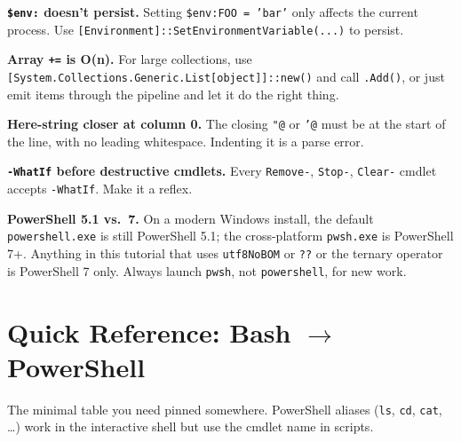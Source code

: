 \documentclass[11pt,a4paper]{article}
\begin{document}
\textbf{\texttt{\$env:} doesn't persist.} Setting
\texttt{\$env:FOO = 'bar'} only affects the current process. Use
\texttt{[Environment]::SetEnvironmentVariable(...)} to persist.

\textbf{Array \texttt{+=} is O(n).} For large collections, use
\texttt{[System.Collections.Generic.List[object]]::new()} and call
\texttt{.Add()}, or just emit items through the pipeline and let it
do the right thing.

\textbf{Here-string closer at column 0.} The closing
\texttt{"@} or \texttt{'@} must be at the start of the line, with
no leading whitespace. Indenting it is a parse error.

\textbf{\texttt{-WhatIf} before destructive cmdlets.} Every
\texttt{Remove-}, \texttt{Stop-}, \texttt{Clear-} cmdlet accepts
\texttt{-WhatIf}. Make it a reflex.

\textbf{PowerShell 5.1 vs.\ 7.} On a modern Windows install, the
default \texttt{powershell.exe} is still PowerShell 5.1; the
cross-platform \texttt{pwsh.exe} is PowerShell 7+. Anything in this
tutorial that uses \texttt{utf8NoBOM} or \texttt{??} or the ternary
operator is PowerShell 7 only. Always launch \texttt{pwsh}, not
\texttt{powershell}, for new work.

\section{Quick Reference: Bash $\to$ PowerShell}

The minimal table you need pinned somewhere. PowerShell aliases
(\texttt{ls}, \texttt{cd}, \texttt{cat}, \dots) work in the interactive
shell but use the cmdlet name in scripts.
\end{document}
